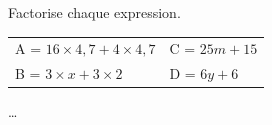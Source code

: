 \begin{exercice*}
    Factorise chaque expression.

    \begin{tabular}{ll}
        A = $16 \times 4,7 + 4 \times 4,7$ & C = $25m + 15$ \\
        B = $3 \times x + 3 \times 2$ & D = $6y + 6$
    \end{tabular}
\end{exercice*}
\begin{corrige}
    \dots
\end{corrige}

